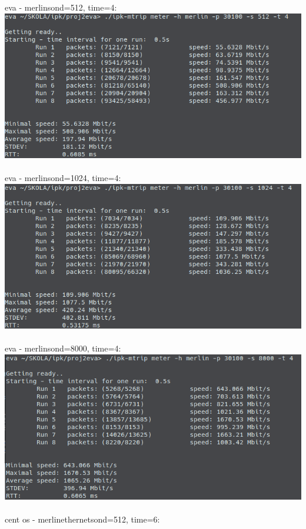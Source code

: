 \documentclass[a4paper, 11pt]{article}
\begin{document}
\newpage
\noindent eva - merlin\qquad sond=512, time=4:\\
\includegraphics[scale=0.5]{pic/eva1.png}\\\\
eva - merlin\qquad sond=1024, time=4:\\
\includegraphics[scale=0.5]{pic/eva3.png}\\\\
eva - merlin\qquad sond=8000, time=4:\\
\includegraphics[scale=0.5]{pic/eva2.png}\\\\
\newpage
\noindent cent os - merlin\qquad ethernet\qquad sond=512, time=6:\\
\end{document}
